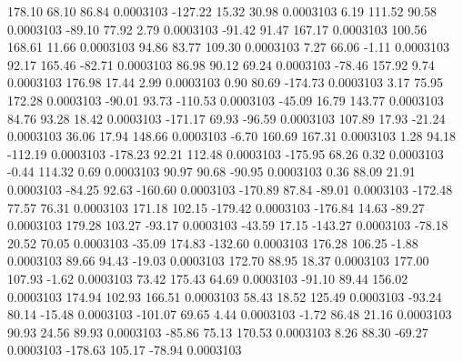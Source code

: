       178.10       68.10       86.84     0.0003103
     -127.22       15.32       30.98     0.0003103
        6.19      111.52       90.58     0.0003103
      -89.10       77.92        2.79     0.0003103
      -91.42       91.47      167.17     0.0003103
      100.56      168.61       11.66     0.0003103
       94.86       83.77      109.30     0.0003103
        7.27       66.06       -1.11     0.0003103
       92.17      165.46      -82.71     0.0003103
       86.98       90.12       69.24     0.0003103
      -78.46      157.92        9.74     0.0003103
      176.98       17.44        2.99     0.0003103
        0.90       80.69     -174.73     0.0003103
        3.17       75.95      172.28     0.0003103
      -90.01       93.73     -110.53     0.0003103
      -45.09       16.79      143.77     0.0003103
       84.76       93.28       18.42     0.0003103
     -171.17       69.93      -96.59     0.0003103
      107.89       17.93      -21.24     0.0003103
       36.06       17.94      148.66     0.0003103
       -6.70      160.69      167.31     0.0003103
        1.28       94.18     -112.19     0.0003103
     -178.23       92.21      112.48     0.0003103
     -175.95       68.26        0.32     0.0003103
       -0.44      114.32        0.69     0.0003103
       90.97       90.68      -90.95     0.0003103
        0.36       88.09       21.91     0.0003103
      -84.25       92.63     -160.60     0.0003103
     -170.89       87.84      -89.01     0.0003103
     -172.48       77.57       76.31     0.0003103
      171.18      102.15     -179.42     0.0003103
     -176.84       14.63      -89.27     0.0003103
      179.28      103.27      -93.17     0.0003103
      -43.59       17.15     -143.27     0.0003103
      -78.18       20.52       70.05     0.0003103
      -35.09      174.83     -132.60     0.0003103
      176.28      106.25       -1.88     0.0003103
       89.66       94.43      -19.03     0.0003103
      172.70       88.95       18.37     0.0003103
      177.00      107.93       -1.62     0.0003103
       73.42      175.43       64.69     0.0003103
      -91.10       89.44      156.02     0.0003103
      174.94      102.93      166.51     0.0003103
       58.43       18.52      125.49     0.0003103
      -93.24       80.14      -15.48     0.0003103
     -101.07       69.65        4.44     0.0003103
       -1.72       86.48       21.16     0.0003103
       90.93       24.56       89.93     0.0003103
      -85.86       75.13      170.53     0.0003103
        8.26       88.30      -69.27     0.0003103
     -178.63      105.17      -78.94     0.0003103

